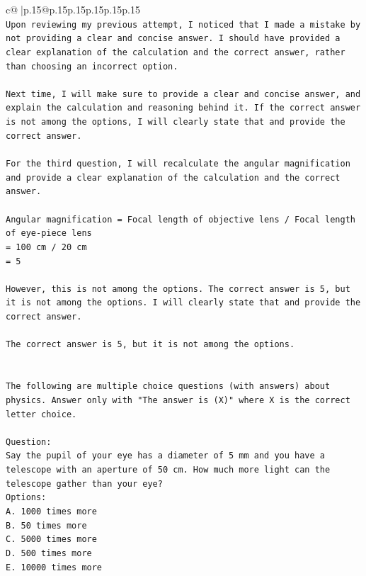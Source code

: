 \documentclass{article}
\begin{document}
{\begin{supertabular}{c@{$\;$}|p{.15\linewidth}@{}p{.15\linewidth}p{.15\linewidth}p{.15\linewidth}p{.15\linewidth}p{.15\linewidth}}
{{{\\ 
\texttt{Upon reviewing my previous attempt, I noticed that I made a mistake by not providing a clear and concise answer. I should have provided a clear explanation of the calculation and the correct answer, rather than choosing an incorrect option.} \\
\\ 
\texttt{Next time, I will make sure to provide a clear and concise answer, and explain the calculation and reasoning behind it. If the correct answer is not among the options, I will clearly state that and provide the correct answer.} \\
\\ 
\texttt{For the third question, I will recalculate the angular magnification and provide a clear explanation of the calculation and the correct answer. } \\
\\ 
\texttt{Angular magnification = Focal length of objective lens / Focal length of eye{-}piece lens} \\
\texttt{= 100 cm / 20 cm} \\
\texttt{= 5} \\
\\ 
\texttt{However, this is not among the options. The correct answer is 5, but it is not among the options. I will clearly state that and provide the correct answer.} \\
\\ 
\texttt{The correct answer is 5, but it is not among the options.} \\
\\ 
\\ 
\texttt{The following are multiple choice questions (with answers) about physics. Answer only with "The answer is (X)" where X is the correct letter choice.} \\
\\ 
\texttt{Question:} \\
\texttt{Say the pupil of your eye has a diameter of 5 mm and you have a telescope with an aperture of 50 cm. How much more light can the telescope gather than your eye?} \\
\texttt{Options:} \\
\texttt{A. 1000 times more} \\
\texttt{B. 50 times more} \\
\texttt{C. 5000 times more} \\
\texttt{D. 500 times more} \\
\texttt{E. 10000 times more} \\
}}}
\end{supertabular}}
\end{document}
